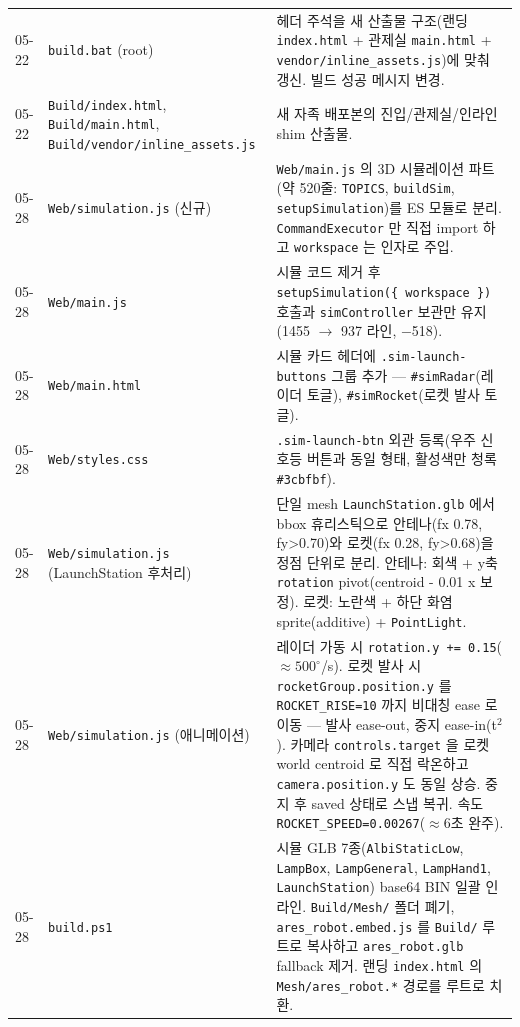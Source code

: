 \documentclass[11pt, oneside]{article}
\begin{document}
\begin{table}[h]
\begin{tabularx}{\linewidth}{@{}llX@{}}
05-22 & \texttt{build.bat} (root) & 헤더 주석을 새 산출물 구조(랜딩 \texttt{index.html} + 관제실 \texttt{main.html} + \texttt{vendor/inline\_assets.js})에 맞춰 갱신. 빌드 성공 메시지 변경. \\
05-22 & \texttt{Build/index.html}, \texttt{Build/main.html}, \texttt{Build/vendor/inline\_assets.js} & 새 자족 배포본의 진입/관제실/인라인 shim 산출물. \\
\midrule
05-28 & \texttt{Web/simulation.js} (신규) & \texttt{Web/main.js} 의 3D 시뮬레이션 파트(약 520줄: \texttt{TOPICS}, \texttt{buildSim}, \texttt{setupSimulation})를 ES 모듈로 분리. \texttt{CommandExecutor} 만 직접 import 하고 \texttt{workspace} 는 인자로 주입. \\
05-28 & \texttt{Web/main.js} & 시뮬 코드 제거 후 \texttt{setupSimulation(\{ workspace \})} 호출과 \texttt{simController} 보관만 유지(1455 $\to$ 937 라인, $-$518). \\
05-28 & \texttt{Web/main.html} & 시뮬 카드 헤더에 \texttt{.sim-launch-buttons} 그룹 추가 — \texttt{\#simRadar}(레이더 토글), \texttt{\#simRocket}(로켓 발사 토글). \\
05-28 & \texttt{Web/styles.css} & \texttt{.sim-launch-btn} 외관 등록(우주 신호등 버튼과 동일 형태, 활성색만 청록 \texttt{\#3cbfbf}). \\
05-28 & \texttt{Web/simulation.js} (LaunchStation 후처리) & 단일 mesh \texttt{LaunchStation.glb} 에서 bbox 휴리스틱으로 안테나(fx 0.78\textendash 0.92, fy>0.70)와 로켓(fx 0.28\textendash 0.46, fy>0.68)을 정점 단위로 분리. 안테나: 회색 + y축 \texttt{rotation} pivot(centroid - 0.01 x 보정). 로켓: 노란색 + 하단 화염 sprite(additive) + \texttt{PointLight}. \\
05-28 & \texttt{Web/simulation.js} (애니메이션) & 레이더 가동 시 \texttt{rotation.y += 0.15}(${\approx}500^{\circ}$/s). 로켓 발사 시 \texttt{rocketGroup.position.y} 를 \texttt{ROCKET\_RISE=10} 까지 비대칭 ease 로 이동 — 발사 ease-out, 중지 ease-in(t$^2$). 카메라 \texttt{controls.target} 을 로켓 world centroid 로 직접 락온하고 \texttt{camera.position.y} 도 동일 상승. 중지 후 saved 상태로 스냅 복귀. 속도 \texttt{ROCKET\_SPEED=0.00267}(${\approx}6$초 완주). \\
05-28 & \texttt{build.ps1} & 시뮬 GLB 7종(\texttt{AlbiStaticLow}, \texttt{LampBox}, \texttt{LampGeneral}, \texttt{LampHand1\textendash 3}, \texttt{LaunchStation}) base64 BIN 일괄 인라인. \texttt{Build/Mesh/} 폴더 폐기, \texttt{ares\_robot.embed.js} 를 \texttt{Build/} 루트로 복사하고 \texttt{ares\_robot.glb} fallback 제거. 랜딩 \texttt{index.html} 의 \texttt{Mesh/ares\_robot.*} 경로를 루트로 치환. \\

\end{tabularx}
\end{table}
\end{document}
